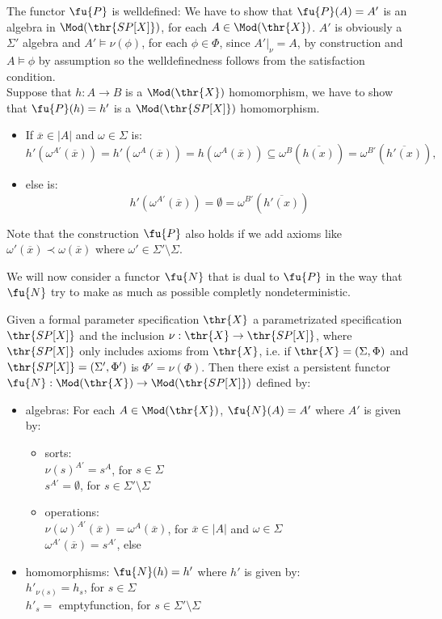\begin{PROOF}
The functor $\fu{P}$ is welldefined:
We have to show that $\fu{P}(A)=A'$ is an algebra in $\Mod(\thr{SP[X]})$, for each $A \in \Mod(\thr{X})$.
$A'$ is obviously a $\Sigma'$ algebra and $A' \models \nu(\phi)$, for each $\phi \in \Phi$, since $A'|_{\nu} = A$, by construction and $A \models \phi$ by assumption so the welldefinedness follows from the satisfaction condition.\\

Suppose that $h:A \to B$ is a $\Mod(\thr{X})$ homomorphism, we have to show that $\fu{P}(h)=h'$ is a $\Mod(\thr{SP[X]})$ homomorphism.
	\begin{itemize}
	\item If $\overline{x} \in |A|$ and $\omega \in \Sigma$ is:
		\[ h'(\omega^{A'}(\overline{x})) = h'(\omega^A(\overline{x})) = h(\omega^A(\overline{x})) \subseteq \omega^B(\overline{h(x)}) = \omega^{B'}(\overline{h'(x)}), \]
	\item else is: 
	\[h'(\omega^{A'}(\overline{x})) = \emptyset = \omega^{B'}(\overline{h'(x)}) \]
	\end{itemize}
\end{PROOF}
		
Note that the construction $\fu{P}$ also holds if we add axioms like $\omega'(\overline{x}) \prec \omega(\overline{x})$ where $\omega'\in \Sigma' \setminus \Sigma$.


We will now consider a functor $\fu{N}$ that is dual to $\fu{P}$ in the way that $\fu{N}$ try to make as much as possible completly nondeterministic.

\begin{proposition} Given a formal parameter specification $\thr{X}$ a parametrizated specification $\thr{SP[X]}$ and the inclusion $\nu:\thr{X} \to \thr{SP[X]}$, where $\thr{SP[X]}$ only includes axioms from $\thr{X}$, i.e. if $\thr{X}=(\Sigma,\Phi)$ and $\thr{SP[X]}=(\Sigma',\Phi')$ is $\Phi'= \nu(\Phi)$. Then there exist a persistent functor $\fu{N}:\Mod(\thr{X}) \to \Mod(\thr{SP[X]})$ defined by:
	\begin{itemize}
	\item algebras: For each $A \in \Mod(\thr{X})$,
	$\fu{N}(A) = A'$ where $A'$ is given by:
		\begin{itemize}
		\item sorts:\\
		$\nu(s)^{A'}= s^A$, for $s \in \Sigma$\\
		$s^{A'} = \emptyset$, for $s \in \Sigma' \setminus \Sigma$
		\item operations: \\
		$\nu(\omega)^{A'}(\overline{x})= \omega^A(\overline{x})$, for $\overline{x} \in |A|$ and $\omega \in \Sigma$\\
		$\omega^{A'}(\overline{x}) = s^{A'}$, else
		\end{itemize}
	\item homomorphisms:
	$\fu{N}(h) = h'$ where $h'$ is given by:\\
		$h'_{\nu(s)} = h_s$, for $s \in \Sigma$\\
		$h'_s =$ emptyfunction, for $s \in \Sigma' \setminus \Sigma$
	\end{itemize}
\end{proposition}

